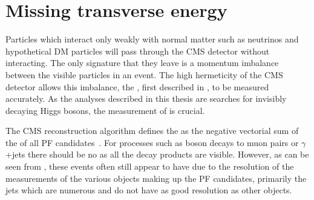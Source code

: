 \section{Missing transverse energy}
\label{sec:MET}
Particles which interact only weakly with normal matter such as neutrinos and hypothetical \ac{DM} particles will pass through the CMS detector without interacting. The only signature that they leave is a momentum imbalance between the visible particles in an event. The high hermeticity of the CMS detector allows this imbalance, the \MET, first described in , to be measured accurately. As the analyses described in this thesis are searches for invisibly decaying Higgs bosons, the measurement of \MET is crucial.

The CMS \MET reconstruction algorithm defines the \MET as the negative vectorial sum of the \pt of all \ac{PF} candidates~\cite{CMS-PAS-JME-12-002}. For processes such as \PZ boson decays to muon pairs or $\gamma$+jets there should be no \MET as all the decay products are visible. However, as can be seen from , these events often still appear to have \MET due to the resolution of the \pt measurements of the various objects making up the \ac{PF} candidates, primarily the jets which are numerous and do not have as good resolution as other objects.

